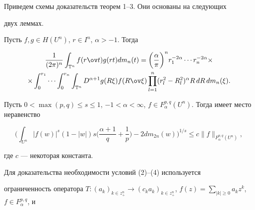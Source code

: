  


Приведем схемы доказательств теорем 1--3. Они основаны на следующих 


двух леммах. 


 


\begin{lem} 


Пусть $f,g\in H(U^n)$, $r\in I^n$, $\alpha>-1$. Тогда 


\begin{multline*} 


\frac{1}{(2\pi)^n}\int_{\Bbb T^n}f(r\ov t)g(r t)d m_n(t)=\bigg( 


\frac{\alpha}{\pi}\bigg)^n r^{-2\alpha}_1\dotsb r^{-2\alpha}_n \times\\


\times\int^{r_1}_0\dotsb\int^{r_n}_0\int_{\Bbb T^n}D^{\alpha+1} 


g(R\xi)f(R\ov\xi)\prod^n_{l=1}(r^2_l-R^2_l)^\alpha 


R\,d R\,d m_n(\xi). 


\end{multline*}  


\end{lem} 


 


\begin{lem} 


Пусть $0<\max(p,q)\le s\le1$, $-1<\alpha<\infty$, $f\in 


F^{p,q}_\alpha(U^n)$. Тогда имеет место неравенство 


$$ 


\bigg(\int_{U^n}|f(w)|^s(1-|w|)s\bigg(\frac{\alpha+1}{q}+ 


\frac{1}{p}\bigg)-2d m_{2n}(w)\bigg)^{1/s}\le 


c\|f\|_{F^{p,q}_\alpha(U^n)},


$$ 


где $c$ --- некоторая константа. 


\end{lem} 


 


Для доказательства необходимости условий (2)--(4) используется 


ограниченность оператора $T:(a_k)_{k\in z^n_+}\to(c_k a_k)_{k\in 


z^n_+}$, $f(z)=\sum\limits_{|k|\ge0}a_k z^k$, $f\in F^{p,q}_\alpha$, и 


